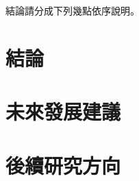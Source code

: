 結論請分成下列幾點依序說明。

\section{結論}
\blindtext[1]


\section{未來發展建議}

\blindtext[1]

\section{後續研究方向}

\blindtext[1]








